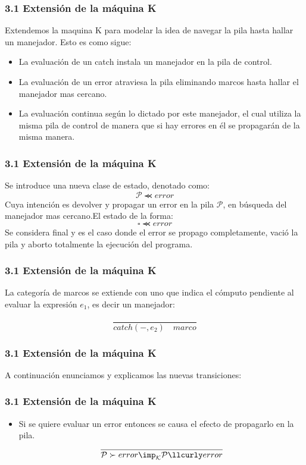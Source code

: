 \documentclass[xcolor=dvipsnames,table,spanish]{beamer}
\begin{document}
\begin{frame}
\frametitle{3.1 Extensión de la máquina K}
Extendemos la maquina K para modelar la idea de navegar la pila hasta hallar un manejador. Esto es como sigue:
\begin{itemize}
		\item La evaluación de un catch instala un manejador en la pila de control.
		\item La evaluación de un error atraviesa la pila eliminando marcos hasta hallar el manejador mas cercano.
		\item La evaluación continua según lo dictado por este manejador, el cual utiliza la misma pila de control de manera que si hay errores en él se propagarán de la misma manera.
\end{itemize}

\end{frame}

\begin{frame}
\frametitle{3.1 Extensión de la máquina K}
Se introduce una nueva clase de estado, denotado como: \[\mathcal{P} \llcurly error\] Cuya intención es devolver y propagar un error en la pila $\mathcal{P}$, en búsqueda del manejador mas cercano.\newline El estado de la forma: \[ \square \llcurly error \] Se considera final y es el caso donde el error se propago completamente, vació la pila y aborto totalmente la ejecución del programa.
\end{frame}

\begin{frame}
\frametitle{3.1 Extensión de la máquina K}
La categoría de marcos se extiende con uno que indica el cómputo pendiente al evaluar la expresión $e_1$, es decir un manejador:

\[\frac{}{catch(-,e_2) \quad marco}\]

\end{frame}

\begin{frame}
\frametitle{3.1 Extensión de la máquina K}
A continuación enunciamos y explicamos las nuevas transiciones:
\end{frame}

\begin{frame}
\frametitle{3.1 Extensión de la máquina K}
\begin{itemize}
		\item Si se quiere evaluar un error entonces se causa el efecto de propagarlo en la pila.
        \[ \frac{}{\mathcal{P} \succ error \imp_{\mathcal{K}}  \mathcal{P} \llcurly error}\]
\end{itemize}
\end{frame}
\end{document}
